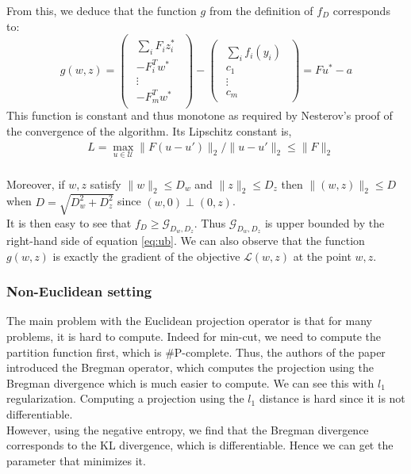 \documentclass{article}
\begin{document}
From this, we deduce that the function $g$ from the definition of $f_D$ corresponds to:
\begin{equation}
  g( w,  z) =
  \begin{pmatrix}
    \begin{array}{c}
      \sum_i  F_i  z_i^*\\
      -  F_i^T  w^*\\
      \vdots\\
      -  F_m^T  w^*
    \end{array}
  \end{pmatrix} -
  \begin{pmatrix}
    \begin{array}{c}
      \sum_i  f_i ( y_i)\\
       c_1\\
      \vdots\\
       c_m
    \end{array}
  \end{pmatrix} =  F  u^* -  a
\end{equation}
This function is constant and thus monotone as required by Nesterov's proof of the convergence of the algorithm. Its Lipschitz constant is,
\begin{equation*}
\begin{aligned}
    &L= \max_{ u \in \mathcal{U}} \lVert  F ( u -  u') \rVert_2 / \lVert  u -  u' \rVert_2 \leq \lVert  F \rVert_2 
\end{aligned}
\end{equation*}
\\
Moreover, if $ w,  z$ satisfy $\lVert  w \rVert_2 \leq D_{ w}$ and $\lVert  z \rVert_2 \leq D_{ z}$ then $\lVert ( w,  z) \rVert_2 \leq D$ when $D = \sqrt{D_{ w}^2 + D_{ z}^2}$ since $( w, 0) \perp (0,  z)$.\\
It is then easy to see that $f_D \geq \mathcal{G}_{D_{ w}, D_{ z}}$. Thus $\mathcal{G}_{D_{ w}, D_{ z}}$ is upper bounded by the right-hand side of equation \ref{eq:ub}. We can also observe that the function $g( w,  z)$ is exactly the gradient of the objective $\mathcal{L}( w,  z)$ at the point $ w,  z$.

\subsubsection{Non-Euclidean setting}
The main problem with the Euclidean projection operator is that for many
problems, it is hard to compute. Indeed for min-cut, we need to
compute the partition function first, which is \#P-complete. Thus, the authors
of the paper introduced the Bregman operator, which computes the projection
using the Bregman divergence which is much easier to compute. We can see this with $l_{1}$ regularization. Computing a
projection using the $l_{1}$ distance is hard since it is not differentiable.\\
However, using the negative entropy, we find that the Bregman divergence corresponds to the KL divergence, which is differentiable. Hence we can get the parameter that minimizes it.
\end{document}

